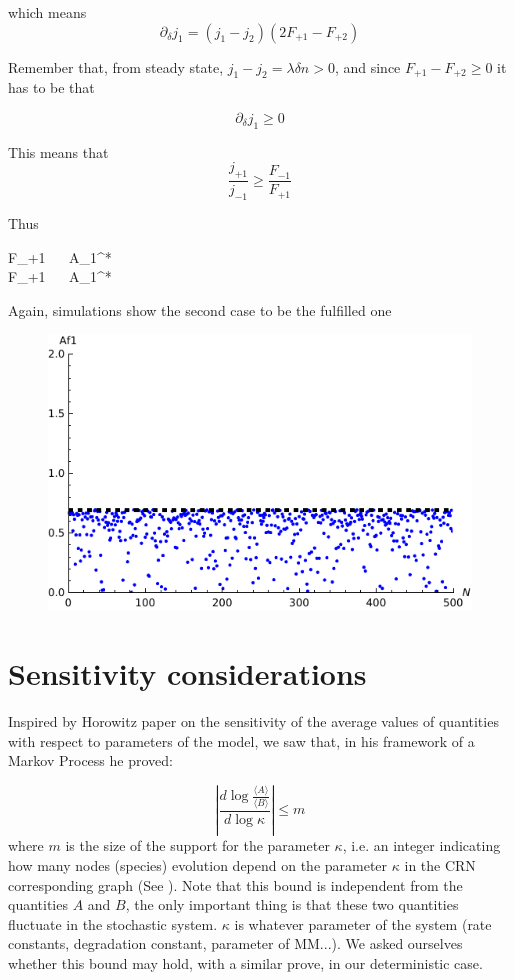 \documentclass{article}
\begin{document}
	which means $$\partial_{\delta}j_1=(j_1-j_2)(2F_{+1}-F_{+2})$$
	
	Remember that, from steady state, $j_1-j_2=\lambda \delta n >0$, and since $F_{+1}-F_{+2} \ge 0$ it has to be that
	
	$$\partial_{\delta}j_1 \ge 0$$
	
	This means that $$\frac{j_{+1}}{j_{-1}} \ge \frac{F_{-1}}{F_{+1}}$$
	
	Thus
	\begin{center}
		\begin{cases}
			F_{+1}  \ \Longleftrightarrow \   \implies A_1^* \ge {}\\
			F_{+1}  \ \Longleftrightarrow \   \implies A_1^* \le {}\\
		\end{cases}
	\end{center}
	
	Again, simulations show the second case to be the fulfilled one
	
	\begin{figure}[H]
		\begin{center}
			\includegraphics[width=0.5\linewidth]{
				A1PP.pdf}
		\end{center}
	\end{figure}
	
	
	
	\section{Sensitivity considerations}
	Inspired by Horowitz paper \cite{3} on the sensitivity of the average values of quantities with respect to parameters of the model, we saw that, in his framework of a Markov Process he proved:
	
	\begin{equation}
		\left|\frac{d \log \frac{\langle A \rangle}{\langle B \rangle} }{d \log \kappa}\right| \le m 
	\end{equation}
	where $m$ is the size of the support for the parameter $\kappa$, i.e. an integer indicating how many nodes (species) evolution depend on the parameter $\kappa$ in the CRN corresponding graph (See \cite{3}). Note that this bound is independent from the quantities $A$ and $B$, the only important thing is that these two quantities fluctuate in the stochastic system. $\kappa$ is whatever parameter of the system (rate constants, degradation constant, parameter of MM...). We asked ourselves whether this bound may hold, with a similar prove, in our deterministic case.
	
\end{document}
